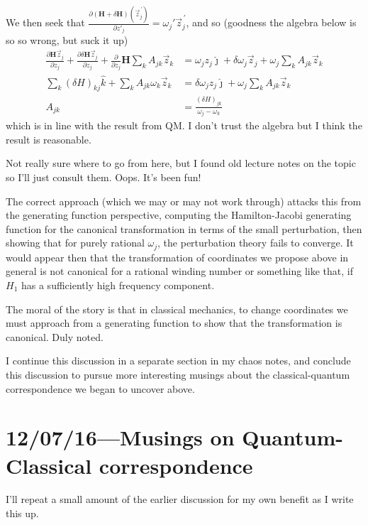 \documentclass[12pt]{report}
\newcommand*{\pd}[2]{\frac{\partial#1}{\partial#2}}
\newcommand*{\pvec}[1]{\vec{#1}^{\,\prime}}
\begin{document}
We then seek that $\pd{(\mathbf{H} + \delta \mathbf{H})(\pvec{z}_j)}{z'_j} =
\omega_j' \pvec{z}_j$, and so (goodness the algebra below is so so wrong, but
suck it up)
\begin{align}
    \pd{\mathbf{H}\vec{z}_j}{z_j} + \pd{\delta \mathbf{H}\vec{z}_j}{z_j} +
        \pd{}{z_j}\mathbf{H}\sum_k A_{jk}\vec{z}_k
        &= \omega_j z_j\hat{\jmath} + \delta
        \omega_j \vec{z}_j + \omega_j \sum_k A_{jk}\vec{z}_k\\
    \sum_k (\delta H)_{kj}\hat{k} + \sum_kA_{jk}\omega_k \vec{z}_k &=
        \delta \omega_j z_j\hat{\jmath} + \omega_j \sum_k A_{jk}\vec{z}_k\\
    A_{jk} &= \frac{(\delta H)_{jk}}{\omega_j - \omega_k}
\end{align}
which is in line with the result from QM\@. I don't trust the algebra but I
think the result is reasonable.

Not really sure where to go from here, but I found old lecture notes on the
topic so I'll just consult them. Oops. It's been fun!

The correct approach (which we may or may not work through) attacks this from
the generating function perspective, computing the Hamilton-Jacobi generating
function for the canonical transformation in terms of the small perturbation,
then showing that for purely rational $\omega_j$, the perturbation theory fails
to converge. It would appear then that the transformation of coordinates we
propose above in general is not canonical for a rational winding number or
something like that, if $H_1$ has a sufficiently high frequency component.

The moral of the story is that in classical mechanics, to change coordinates we
must approach from a generating function to show that the transformation is
canonical. Duly noted.

I continue this discussion in a separate section in my chaos notes, and conclude
this discussion to pursue more interesting musings about the classical-quantum
correspondence we began to uncover above.

\clearpage

\chapter{12/07/16---Musings on Quantum-Classical correspondence}

I'll repeat a small amount of the earlier discussion for my own benefit as I
write this up.
\end{document}
